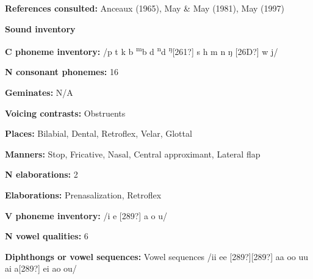 \begin{styleBody}
\textbf{References consulted: }Anceaux (1965), May \& May (1981), May (1997)
\end{styleBody}

\begin{styleBody}
\textbf{Sound inventory}
\end{styleBody}

\begin{styleBody}
\textbf{C phoneme inventory:} /p t k b \textsuperscript{m}b d \textsuperscript{n}d \textsuperscript{ŋ}[261?] s h m n ŋ [26D?] w j/
\end{styleBody}

\begin{styleBody}
\textbf{N consonant phonemes:} 16
\end{styleBody}

\begin{styleBody}
\textbf{Geminates:} N/A
\end{styleBody}

\begin{styleBody}
\textbf{Voicing contrasts:} Obstruents
\end{styleBody}

\begin{styleBody}
\textbf{Places:} Bilabial, Dental, Retroflex, Velar, Glottal
\end{styleBody}

\begin{styleBody}
\textbf{Manners:} Stop, Fricative, Nasal, Central approximant, Lateral flap
\end{styleBody}

\begin{styleBody}
\textbf{N elaborations:} 2
\end{styleBody}

\begin{styleBody}
\textbf{Elaborations:} Prenasalization, Retroflex
\end{styleBody}

\begin{styleBody}
\textbf{V phoneme inventory:} /i e [289?] a o u/
\end{styleBody}

\begin{styleBody}
\textbf{N vowel qualities:} 6
\end{styleBody}

\begin{styleBody}
\textbf{Diphthongs or vowel sequences:} Vowel sequences /ii ee [289?][289?] aa oo uu ai a[289?] ei ao ou/
\end{styleBody}

